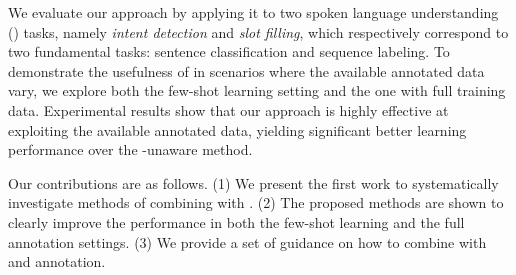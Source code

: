 %
We evaluate our approach by applying it to two spoken language understanding (\SLU) tasks, namely \emph{intent detection} and \emph{slot
filling}, which respectively correspond to two fundamental \NLP tasks: sentence classification and sequence labeling. To demonstrate the
usefulness of \REs in scenarios where the available annotated data vary, we explore both the few-shot learning setting and the one with
full training data. Experimental results show that our approach is highly effective at exploiting the available annotated data, yielding
significant better learning performance over the \RE-unaware method.




Our contributions are as follows. (1) We present the first work to systematically investigate methods of combining \REs with \NNs. (2) The
proposed methods are shown to clearly improve the \NN performance in both the few-shot learning and the full annotation settings. (3) We
provide a set of guidance on how to combine \REs with \NNs and \RE annotation.

